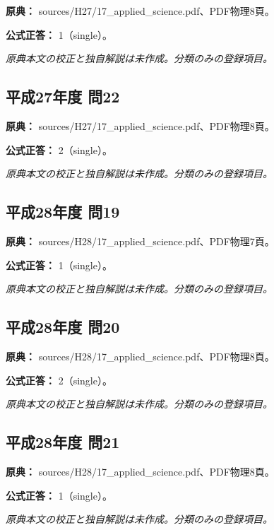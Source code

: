 \noindent\textbf{原典：} sources/H27/17\_applied\_science.pdf、PDF物理8頁。

\textbf{公式正答：} 1（single）。

\par\textit{原典本文の校正と独自解説は未作成。分類のみの登録項目。}

\subsection{平成27年度 問22}
\label{q:h27-reg-applied-22}

\noindent\textbf{原典：} sources/H27/17\_applied\_science.pdf、PDF物理8頁。

\textbf{公式正答：} 2（single）。

\par\textit{原典本文の校正と独自解説は未作成。分類のみの登録項目。}

\subsection{平成28年度 問19}
\label{q:h28-reg-applied-19}

\noindent\textbf{原典：} sources/H28/17\_applied\_science.pdf、PDF物理7頁。

\textbf{公式正答：} 1（single）。

\par\textit{原典本文の校正と独自解説は未作成。分類のみの登録項目。}

\subsection{平成28年度 問20}
\label{q:h28-reg-applied-20}

\noindent\textbf{原典：} sources/H28/17\_applied\_science.pdf、PDF物理8頁。

\textbf{公式正答：} 2（single）。

\par\textit{原典本文の校正と独自解説は未作成。分類のみの登録項目。}

\subsection{平成28年度 問21}
\label{q:h28-reg-applied-21}

\noindent\textbf{原典：} sources/H28/17\_applied\_science.pdf、PDF物理8頁。

\textbf{公式正答：} 1（single）。

\par\textit{原典本文の校正と独自解説は未作成。分類のみの登録項目。}

